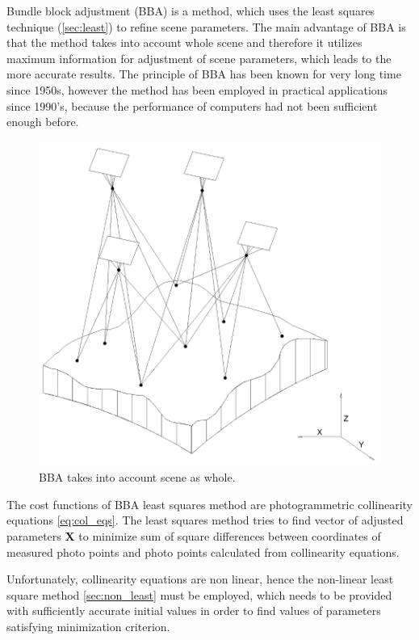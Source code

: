 \documentclass[a4paper,12pt]{article}
\newcommand{\evect}[1]{
{\bf #1}
}
\begin{document}
Bundle block adjustment (BBA) is a method, which uses the least squares technique (\ref{sec:least}) to refine scene parameters. 
The main advantage of BBA is that the method takes into account whole scene and therefore it utilizes 
maximum information for adjustment of scene parameters, which leads to the more accurate results.
The principle of BBA has been known for very long time since 1950s,
however the method has been employed in practical applications since 1990's, because the performance of computers had not been 
sufficient enough before. 


\begin{figure}[h]
    \centering
    \includegraphics[scale=0.3]{figures/bba.png}
    \caption{BBA takes into account scene as whole.}
    \label{fig:rel_or_amb}
\end{figure}

The cost functions of BBA least squares method are photogrammetric collinearity equations \eqref{eq:col_eqs}.
The least squares method tries to find vector of adjusted parameters \evect{X} to minimize
sum  of square differences between coordinates of measured photo points and photo points calculated 
from collinearity equations.

Unfortunately, collinearity equations are non linear, hence the non-linear least square method \ref{sec:non_least} must be employed, which 
needs to be provided  with sufficiently accurate initial values in order to find values of parameters satisfying minimization criterion.
\end{document}
